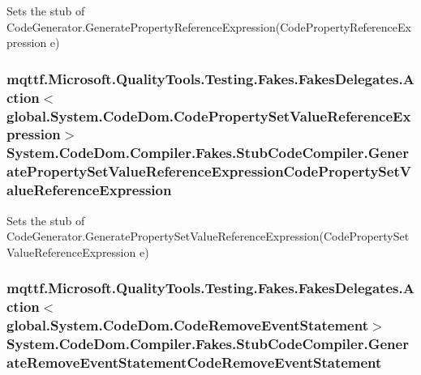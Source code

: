 Sets the stub of Code\-Generator.\-Generate\-Property\-Reference\-Expression(\-Code\-Property\-Reference\-Expression e)

\hypertarget{class_system_1_1_code_dom_1_1_compiler_1_1_fakes_1_1_stub_code_compiler_ac2001ad923c57b59f9a43cb1059e6e47}{
\subsubsection[{Generate\-Property\-Set\-Value\-Reference\-Expression\-Code\-Property\-Set\-Value\-Reference\-Expression}]{\setlength{\rightskip}{0pt plus 5cm}mqttf.\-Microsoft.\-Quality\-Tools.\-Testing.\-Fakes.\-Fakes\-Delegates.\-Action$<$global.\-System.\-Code\-Dom.\-Code\-Property\-Set\-Value\-Reference\-Expression$>$ System.\-Code\-Dom.\-Compiler.\-Fakes.\-Stub\-Code\-Compiler.\-Generate\-Property\-Set\-Value\-Reference\-Expression\-Code\-Property\-Set\-Value\-Reference\-Expression}}\label{class_system_1_1_code_dom_1_1_compiler_1_1_fakes_1_1_stub_code_compiler_ac2001ad923c57b59f9a43cb1059e6e47}


Sets the stub of Code\-Generator.\-Generate\-Property\-Set\-Value\-Reference\-Expression(\-Code\-Property\-Set\-Value\-Reference\-Expression e)

\hypertarget{class_system_1_1_code_dom_1_1_compiler_1_1_fakes_1_1_stub_code_compiler_aa48c50f104c6aefe788ffcb4a4c627eb}{
\subsubsection[{Generate\-Remove\-Event\-Statement\-Code\-Remove\-Event\-Statement}]{\setlength{\rightskip}{0pt plus 5cm}mqttf.\-Microsoft.\-Quality\-Tools.\-Testing.\-Fakes.\-Fakes\-Delegates.\-Action$<$global.\-System.\-Code\-Dom.\-Code\-Remove\-Event\-Statement$>$ System.\-Code\-Dom.\-Compiler.\-Fakes.\-Stub\-Code\-Compiler.\-Generate\-Remove\-Event\-Statement\-Code\-Remove\-Event\-Statement}}\label{class_system_1_1_code_dom_1_1_compiler_1_1_fakes_1_1_stub_code_compiler_aa48c50f104c6aefe788ffcb4a4c627eb}


